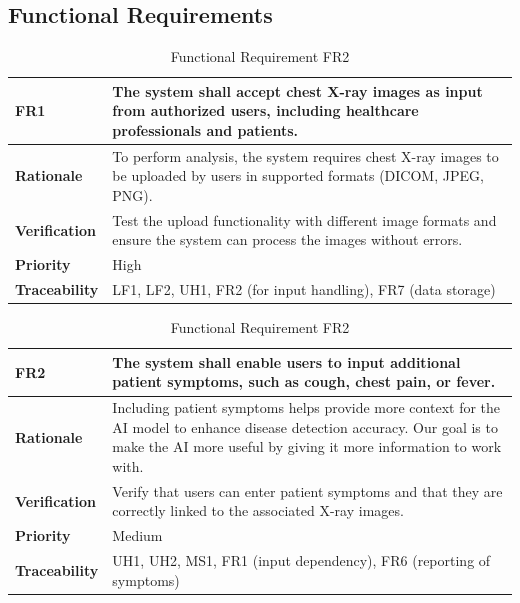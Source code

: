 \documentclass[12pt]{article}
\begin{document}
\subsection{Functional Requirements}
\begin{table}[h!]
\centering
{} %
\begin{tabular}{|p{3.5cm}|p{11.5cm}|}
\hline
\rowcolor{gray!30} %
\textbf{FR1} & The system shall accept chest X-ray images as input from authorized users, including healthcare professionals and patients. \\
\hline
\textbf{Rationale} & To perform analysis, the system requires chest X-ray images to be uploaded by users in supported formats (DICOM, JPEG, PNG). \\
\hline
\textbf{Verification} & Test the upload functionality with different image formats and ensure the system can process the images without errors. \\
\hline
\textbf{Priority} & High \\
\hline
\textbf{Traceability} & LF1, LF2, UH1, FR2 (for input handling), FR7 (data storage) \\
\hline
\end{tabular}
\caption{Functional Requirement FR1}
\centering
{}
\begin{tabular}{|p{3.5cm}|p{11.5cm}|}
\hline
\rowcolor{gray!30}
\textbf{FR2} & The system shall enable users to input additional patient symptoms, such as cough, chest pain, or fever. \\
\hline
\textbf{Rationale} & Including patient symptoms helps provide more context for the AI model to enhance disease detection accuracy. Our goal is to make the AI more useful by giving it more information to work with. \\
\hline
\textbf{Verification} & Verify that users can enter patient symptoms and that they are correctly linked to the associated X-ray images. \\
\hline
\textbf{Priority} & Medium \\
\hline
\textbf{Traceability} & UH1, UH2, MS1, FR1 (input dependency), FR6 (reporting of symptoms) \\
\hline
\end{tabular}
\caption{Functional Requirement FR2}
\end{table}
\end{document}
